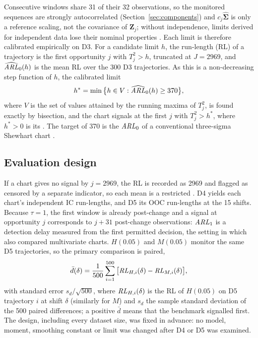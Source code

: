 Consecutive windows share 31 of their 32 observations, so the monitored sequences are strongly
autocorrelated (Section~\ref{sec:components}) and $c_j\hat{\bm{\Sigma}}$ is only a reference scaling, not the covariance of $\bm{Z}_j$; without independence, limits derived for independent data lose their nominal \ARL{} properties \citep{lowry_multivariate_1992}. Each limit is therefore calibrated
empirically on D3. For a candidate limit $h$, the run-length (RL) of a trajectory is the first opportunity $j$ with $T_j^2>h$, truncated at $J=2969$, and $\widehat{\mathit{ARL}}_0(h)$ is the mean RL over the 300 D3 trajectories. As this is a
non-decreasing step function of $h$, the calibrated limit
\begin{equation}
h^*=\min\big\{h\in V:\widehat{\mathit{ARL}}_0(h)\ge370\big\},
\label{eq:limit}
\end{equation}
where $V$ is the set of values attained by the running maxima of $T_j^2$, is found exactly by bisection, and the chart signals at the first $j$ with $T_j^2>h^*$, where $h^*>0$ is its \UCL{}. The target of 370 is the $\mathit{ARL}_0$ of a conventional three-sigma Shewhart chart
\citep{ahmed_statistical_2017}.

\subsection{Evaluation design}

If a chart gives no signal by $j=2969$, the RL is recorded as 2969 and flagged as censored by a separate indicator, so each mean is a restricted \ARL{}. D4 yields each chart's independent IC run-lengths, and D5 its OOC run-lengths at the 15 shifts. Because \mbox{$\tau=1$}, the first window is already post-change and a signal at
opportunity $j$ corresponds to $j+31$ post-change observations: $\mathit{ARL}_1$ is a detection delay
measured from the first permitted decision, the setting in which \citet{lowry_multivariate_1992}
also compared multivariate charts. $H(0.05)$ and $M(0.05)$ monitor the same D5 trajectories, so the
primary comparison is paired,
\begin{equation}
\bar d(\delta)=\frac{1}{500}\sum_{i=1}^{500}\big[\mathit{RL}_{H,i}(\delta)-\mathit{RL}_{M,i}(\delta)\big],
\label{eq:paired}
\end{equation}
with standard error $s_d/\sqrt{500}$, where $\mathit{RL}_{H,i}(\delta)$ is the RL of $H(0.05)$ on D5 trajectory $i$ at shift $\delta$ (similarly for $M$) and $s_d$ the sample standard deviation of the 500 paired differences; a positive $\bar d$ means that the benchmark signalled first.
The design, including every dataset size, was fixed in advance: no model, moment, smoothing constant or limit was changed after D4
or D5 was examined.
